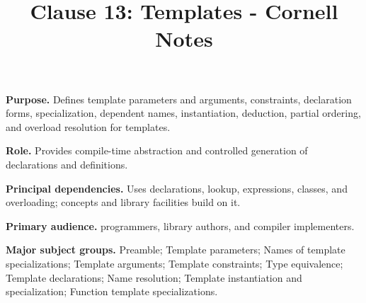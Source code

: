 \documentclass[11pt,letterpaper]{article}
\title{Clause 13: Templates - Cornell Notes}
\author{}
\date{}
\begin{document}
\maketitle
\begin{CornellReferenceOrientationBox}
\textbf{Purpose.} Defines template parameters and arguments, constraints, declaration forms, specialization, dependent names, instantiation, deduction, partial ordering, and overload resolution for templates.
\par\textbf{Role.} Provides compile-time abstraction and controlled generation of declarations and definitions.
\par\textbf{Principal dependencies.} Uses declarations, lookup, expressions, classes, and overloading; concepts and library facilities build on it.
\par\textbf{Primary audience.} programmers, library authors, and compiler implementers.
\par\textbf{Major subject groups.} Preamble; Template parameters; Names of template specializations; Template arguments; Template constraints; Type equivalence; Template declarations; Name resolution; Template instantiation and specialization; Function template specializations.
\end{CornellReferenceOrientationBox}
\end{document}
